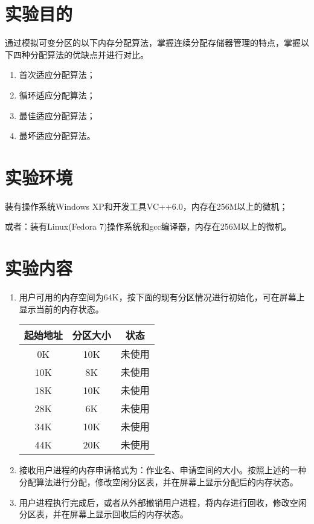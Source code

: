 \documentclass[c5size,a4paper,nofonts]{ctexart}
\begin{document}

\setcounter{part}{3}
\def\today{2015~年~6~月~6~日}


\iffalse
\section{实验目的}
通过模拟可变分区的以下内存分配算法，掌握连续分配存储器管理的特点，掌握以下四种分配算法的优缺点并进行对比。
\begin{enumerate}
\item 首次适应分配算法；
\item 循环适应分配算法；
\item 最佳适应分配算法；
\item 最坏适应分配算法。
\end{enumerate}

\section{实验环境}
装有操作系统Windows XP和开发工具VC++6.0，内存在256M以上的微机；

或者：装有Linux(Fedora 7)操作系统和gcc编译器，内存在256M以上的微机。

\section{实验内容}
\begin{enumerate}[label={(\arabic*)}]
\item 用户可用的内存空间为64K，按下面的现有分区情况进行初始化，可在屏幕上显示当前的内存状态。
\UndefineShortVerb{\|}
\begin{tabular}{|c|c|c|}\hline
起始地址 & 分区大小 & 状态\\\hline
0K & 10K & 未使用\\\hline
10K & 8K & 未使用\\\hline
18K & 10K & 未使用\\\hline
28K & 6K & 未使用\\\hline
34K & 10K & 未使用\\\hline
44K & 20K & 未使用\\\hline
\end{tabular}
\DefineShortVerb{\|}
\item 接收用户进程的内存申请格式为：作业名、申请空间的大小。按照上述的一种分配算法进行分配，修改空闲分区表，并在屏幕上显示分配后的内存状态。
\item 用户进程执行完成后，或者从外部撤销用户进程，将内存进行回收，修改空闲分区表，并在屏幕上显示回收后的内存状态。
\end{enumerate}
\end{document}

